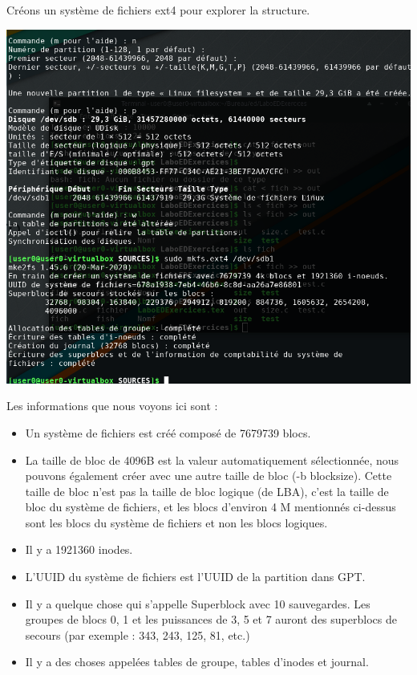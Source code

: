 \documentclass[12pt, letterpaper]{report}
\begin{document}
Créons un système de fichiers ext4 pour explorer la structure.
\begin{center}
	\includegraphics[width=\textwidth]{mount}
\end{center}

Les informations que nous voyons ici sont :\newline
\begin{itemize}
  \item Un système de fichiers est créé composé de 7679739 blocs.
  \item La taille de bloc de 4096B est la valeur automatiquement sélectionnée, nous pouvons également créer avec une autre taille de bloc (-b blocksize). Cette taille de bloc n'est pas la taille de bloc logique (de LBA), c'est la taille de bloc du système de fichiers, et les blocs d'environ 4 M mentionnés ci-dessus sont les blocs du système de fichiers et non les blocs logiques.
  \item Il y a 1921360 inodes.
  \item	L'UUID du système de fichiers est l'UUID de la partition dans GPT.
  \item Il y a quelque chose qui s'appelle Superblock avec 10 sauvegardes. Les groupes de blocs 0, 1 et les puissances de 3, 5 et 7 auront des superblocs de secours (par exemple : 343, 243, 125, 81, etc.)
  \item Il y a des choses appelées tables de groupe, tables d'inodes et journal.
\end{itemize}
\end{document}
